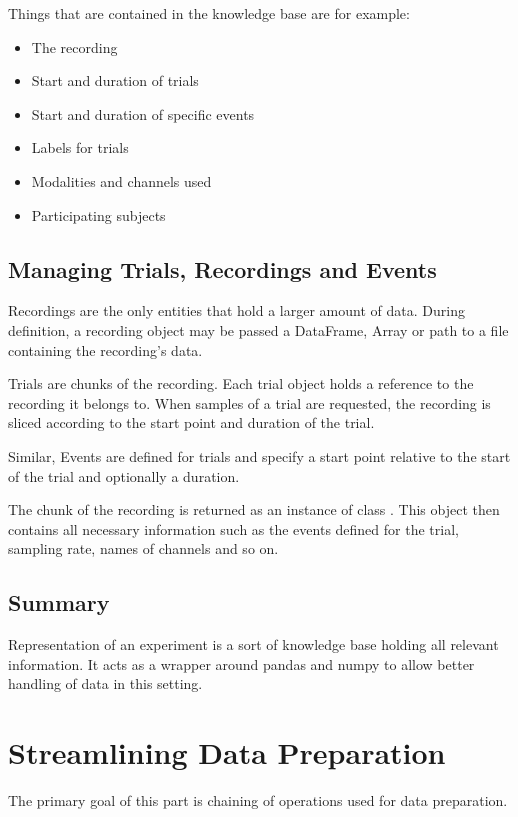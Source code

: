 \documentclass[letterpaper,10pt,english]{sphinxmanual}
\begin{document}
Things that are contained in the knowledge base are for example:
\begin{itemize}
\item {} 
The recording

\item {} 
Start and duration of trials

\item {} 
Start and duration of specific events

\item {} 
Labels for trials

\item {} 
Modalities and channels used

\item {} 
Participating subjects

\end{itemize}


\subsection{Managing Trials, Recordings and Events}
\label{implementation:managing-trials-recordings-and-events}
Recordings are the only entities that hold a larger amount of data. During
definition, a recording object may be passed a DataFrame, Array or path to
a file containing the recording's data.

Trials are chunks of the recording. Each trial object holds a reference to
the recording it belongs to. When samples of a trial are requested, the
recording is sliced according to the start point and duration of the trial.

Similar, Events are defined for trials and specify a start point relative to
the start of the trial and optionally a duration.

The chunk of the recording is returned as an instance of class
. This object then contains all necessary information such as
the events defined for the trial, sampling rate, names of channels and so on.


\subsection{Summary}
\label{implementation:summary}
Representation of an experiment is a sort of knowledge base holding all
relevant information. It acts as a wrapper around pandas and numpy to allow
better handling of data in this setting.


\section{Streamlining Data Preparation}
\label{implementation:streamlining-data-preparation}
The primary goal of this part is chaining of operations used for
data preparation.
\end{document}

